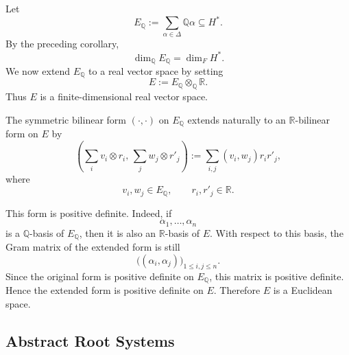 Let
\[
    E_{\mathbb{Q}}
    :=
    \sum_{\alpha\in\Delta}\mathbb{Q}\alpha
    \subseteq H^*.
\]
By the preceding corollary,
\[
    \dim_{\mathbb{Q}}E_{\mathbb{Q}}
    =
    \dim_F H^*.
\]
We now extend \(E_{\mathbb{Q}}\) to a real vector space by setting
\[
    E
    :=
    E_{\mathbb{Q}}\otimes_{\mathbb{Q}}\mathbb{R}.
\]
Thus \(E\) is a finite-dimensional real vector space.

The symmetric bilinear form \((\cdot,\cdot)\) on \(E_{\mathbb{Q}}\) extends
naturally to an \(\mathbb{R}\)-bilinear form on \(E\) by
\[
    \left(
    \sum_i v_i\otimes r_i,\,
    \sum_j w_j\otimes r'_j
    \right)
    :=
    \sum_{i,j} (v_i,w_j) r_i r'_j,
\]
where
\[
    v_i,w_j\in E_{\mathbb{Q}},
    \qquad
    r_i,r'_j\in \mathbb{R}.
\]

This form is positive definite. Indeed, if
\[
    \alpha_1,\dots,\alpha_n
\]
is a \(\mathbb{Q}\)-basis of \(E_{\mathbb{Q}}\), then it is also an
\(\mathbb{R}\)-basis of \(E\). With respect to this basis, the Gram matrix of
the extended form is still
\[
    \bigl((\alpha_i,\alpha_j)\bigr)_{1\le i,j\le n}.
\]
Since the original form is positive definite on \(E_{\mathbb{Q}}\), this
matrix is positive definite. Hence the extended form is positive definite on
\(E\). Therefore \(E\) is a Euclidean space.

\subsection{Abstract Root Systems}

